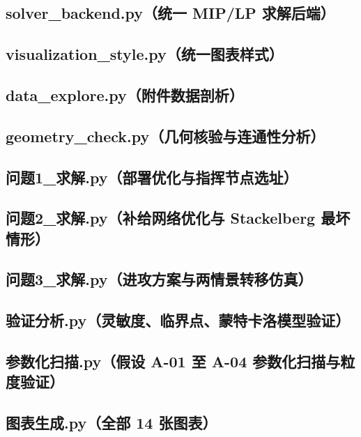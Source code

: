\documentclass[12pt,a4paper]{ctexart}
\begin{document}
\subsection{solver\_backend.py（统一 MIP/LP 求解后端）}

\subsection{visualization\_style.py（统一图表样式）}

\subsection{data\_explore.py（附件数据剖析）}

\subsection{geometry\_check.py（几何核验与连通性分析）}

\subsection{问题1\_求解.py（部署优化与指挥节点选址）}

\subsection{问题2\_求解.py（补给网络优化与 Stackelberg 最坏情形）}

\subsection{问题3\_求解.py（进攻方案与两情景转移仿真）}

\subsection{验证分析.py（灵敏度、临界点、蒙特卡洛模型验证）}

\subsection{参数化扫描.py（假设 A-01 至 A-04 参数化扫描与粒度验证）}

\subsection{图表生成.py（全部 14 张图表）}
\end{document}
